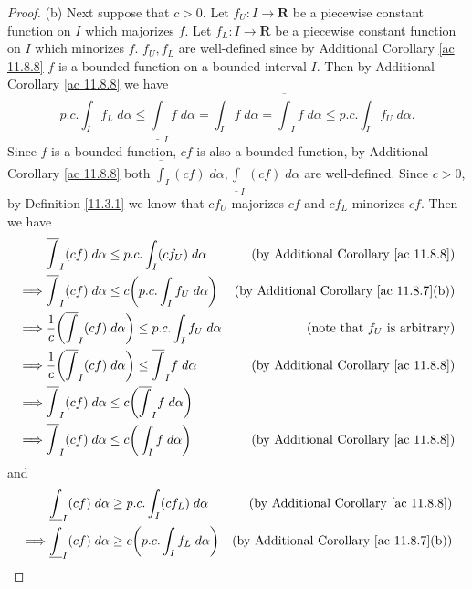 \begin{proof}{(b)}
    Next suppose that \(c > 0\).
    Let \(f_U : I \to \mathbf{R}\) be a piecewise constant function on \(I\) which majorizes \(f\).
    Let \(f_L : I \to \mathbf{R}\) be a piecewise constant function on \(I\) which minorizes \(f\).
    \(f_U, f_L\) are well-defined since by Additional Corollary \ref{ac 11.8.8} \(f\) is a bounded function on a bounded interval \(I\).
    Then by Additional Corollary \ref{ac 11.8.8} we have
    \[
        p.c. \int_I f_L \; d \alpha \leq \underline{\int}_I f \; d \alpha = \int_I f \; d \alpha = \overline{\int}_I f \; d \alpha \leq p.c. \int_I f_U \; d \alpha.
    \]
    Since \(f\) is a bounded function, \(cf\) is also a bounded function, by Additional Corollary \ref{ac 11.8.8} both \(\overline{\int}_I (cf) \; d \alpha, \underline{\int}_I (cf) \; d \alpha\) are well-defined.
    Since \(c > 0\), by Definition \ref{11.3.1} we know that \(c f_U\) majorizes \(c f\) and \(c f_L\) minorizes \(c f\).
    Then we have
    \begin{align*}
                 & \overline{\int}_I (cf) \; d \alpha \leq p.c. \int_I (c f_U) \; d \alpha                         & \text{(by Additional Corollary \ref{ac 11.8.8})}    \\
        \implies & \overline{\int}_I (cf) \; d \alpha \leq c \bigg(p.c. \int_I f_U \; d \alpha\bigg)               & \text{(by Additional Corollary \ref{ac 11.8.7}(b))} \\
        \implies & \frac{1}{c} \bigg(\overline{\int}_I (cf) \; d \alpha\bigg) \leq p.c. \int_I f_U \; d \alpha     & \text{(note that \(f_U\) is arbitrary)}             \\
        \implies & \frac{1}{c} \bigg(\overline{\int}_I (cf) \; d \alpha\bigg) \leq \overline{\int}_I f \; d \alpha & \text{(by Additional Corollary \ref{ac 11.8.8})}    \\
        \implies & \overline{\int}_I (cf) \; d \alpha \leq c\bigg(\overline{\int}_I f \; d \alpha\bigg)                                                                  \\
        \implies & \overline{\int}_I (cf) \; d \alpha \leq c\bigg(\int_I f \; d \alpha\bigg)                       & \text{(by Additional Corollary \ref{ac 11.8.8})}
    \end{align*}
    and
    \begin{align*}
                 & \underline{\int}_I (cf) \; d \alpha \geq p.c. \int_I (c f_L) \; d \alpha                          & \text{(by Additional Corollary \ref{ac 11.8.8})}    \\
        \implies & \underline{\int}_I (cf) \; d \alpha \geq c \bigg(p.c. \int_I f_L \; d \alpha\bigg)                & \text{(by Additional Corollary \ref{ac 11.8.7}(b))} \\

\end{align*}
\end{proof}
